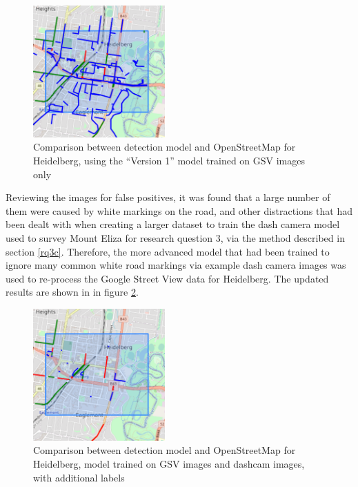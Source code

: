 \documentclass[11pt,twoside]{report}
\begin{document}
\begin{figure}[t!]
\centering
\includegraphics[width=0.45\textwidth]{h_map1_4.png}
\caption{Comparison between detection model and OpenStreetMap for Heidelberg, using the ``Version 1'' model trained on GSV images only}
\label{fig:heidelberg_bad}
\end{figure}

Reviewing the images for false positives, it was found that a large number of them were caused by white markings on the road, and other distractions that had been dealt with when creating a larger dataset to train the dash camera model used to survey Mount Eliza for research question 3, via the method described in section \ref{rq3c}.  Therefore, the more advanced model that had been trained to ignore many common white road markings via example dash camera images was used to re-process the Google Street View data for Heidelberg.  The updated results are shown in in figure \ref{fig:heidelberg_good}.

\begin{figure}[h]
\centering
\includegraphics[width=0.45\textwidth]{h_model_V2.png}
\caption{Comparison between detection model and OpenStreetMap for Heidelberg, model trained on GSV images and dashcam images, with additional labels}
\label{fig:heidelberg_good}
\end{figure}
\end{document}

